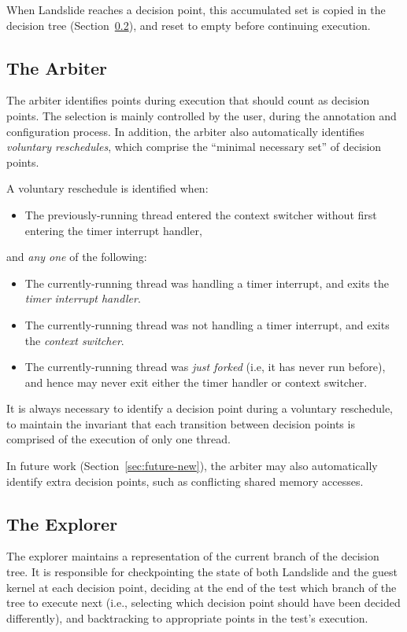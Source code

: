 When Landslide reaches a decision point, this accumulated set is copied in the decision tree (Section~\ref{sec:components-explore}), and reset to empty before continuing execution.

\subsection{The Arbiter}
\label{sec:components-arbiter}

The arbiter identifies points during execution that should count as decision points. The selection is mainly controlled by the user, during the annotation and configuration process. In addition, the arbiter also automatically identifies {\em voluntary reschedules}, which comprise the ``minimal necessary set'' of decision points.

A voluntary reschedule is identified when:
\begin{itemize}
	\item The previously-running thread entered the context switcher without first entering the timer interrupt handler,
\end{itemize}

and {\em any one} of the following:
\begin{itemize}
	\item The currently-running thread was handling a timer interrupt, and exits the {\em timer interrupt handler}.
	\item The currently-running thread was not handling a timer interrupt, and exits the {\em context switcher}.
	\item The currently-running thread was {\em just forked} (i.e, it has never run before), and hence may never exit either the timer handler or context switcher.
\end{itemize}

It is always necessary to identify a decision point during a voluntary reschedule, to maintain the invariant that each transition between decision points is comprised of the execution of only one thread.

In future work (Section~\ref{sec:future-new}), the arbiter may also automatically identify extra decision points, such as conflicting shared memory accesses.

\subsection{The Explorer}
\label{sec:components-explore}

The explorer maintains a representation of the current branch of the decision tree. It is responsible for checkpointing the state of both Landslide and the guest kernel at each decision point, deciding at the end of the test which branch of the tree to execute next (i.e., selecting which decision point should have been decided differently), and backtracking to appropriate points in the test's execution.

